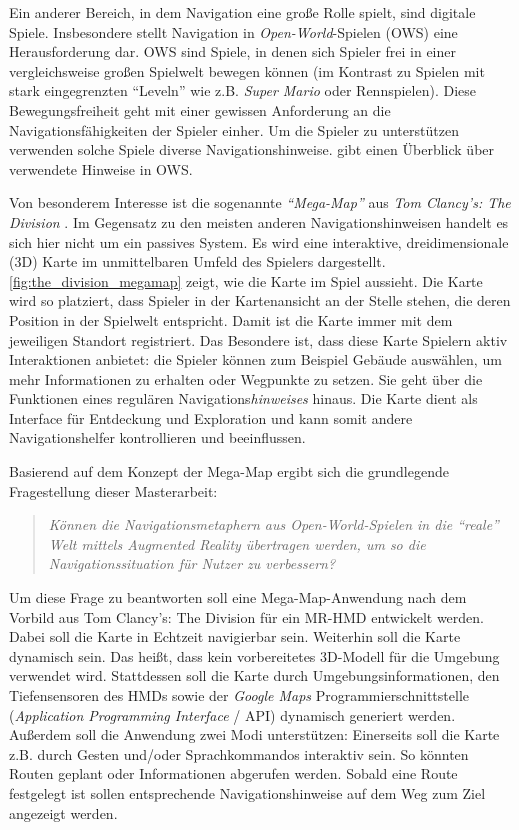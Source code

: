 \documentclass[a4paper]{scrartcl}
\begin{document}
Ein anderer Bereich, in dem Navigation eine große Rolle spielt, sind digitale Spiele.
Insbesondere stellt Navigation in \emph{Open-World}-Spielen (OWS) eine Herausforderung dar.
OWS sind Spiele, in denen sich Spieler frei in einer vergleichsweise großen Spielwelt bewegen können (im Kontrast zu Spielen mit stark eingegrenzten \enquote{Leveln} wie z.B. \emph{Super Mario} oder Rennspielen).
Diese Bewegungsfreiheit geht mit einer gewissen Anforderung an die Navigationsfähigkeiten der Spieler einher.
Um die Spieler zu unterstützen verwenden solche Spiele diverse Navigationshinweise.
\textcite{Lodts2015} gibt einen Überblick über verwendete Hinweise in OWS.

Von besonderem Interesse ist die sogenannte \emph{\enquote{Mega-Map}} aus \emph{Tom Clancy's: The Division} \autocite{Ubisoft2018}.
Im Gegensatz zu den meisten anderen Navigationshinweisen handelt es sich hier nicht um ein passives System.
Es wird eine interaktive, dreidimensionale (3D) Karte im unmittelbaren Umfeld des Spielers dargestellt.
\autoref{fig:the_division_megamap} zeigt, wie die Karte im Spiel aussieht.
Die Karte wird so platziert, dass Spieler in der Kartenansicht an der Stelle stehen, die deren Position in der Spielwelt entspricht.
Damit ist die Karte immer mit dem jeweiligen Standort registriert.
Das Besondere ist, dass diese Karte Spielern aktiv Interaktionen anbietet:
die Spieler können zum Beispiel Gebäude auswählen, um mehr Informationen zu erhalten oder Wegpunkte zu setzen.
Sie geht über die Funktionen eines regulären Navigations\emph{hinweises} hinaus.
Die Karte dient als Interface für Entdeckung und Exploration und kann somit andere Navigationshelfer kontrollieren und beeinflussen.

Basierend auf dem Konzept der Mega-Map ergibt sich die grundlegende Fragestellung dieser Masterarbeit:
\begin{quote}
	\itshape
	Können die Navigationsmetaphern aus Open-World-Spielen in die \enquote{reale} Welt mittels Augmented Reality übertragen werden, um so die Navigationssituation für Nutzer zu verbessern?
\end{quote}

Um diese Frage zu beantworten soll eine Mega-Map-Anwendung nach dem Vorbild aus Tom Clancy's: The Division für ein MR-HMD entwickelt werden.
Dabei soll die Karte in Echtzeit navigierbar sein.
Weiterhin soll die Karte dynamisch sein.
Das heißt, dass kein vorbereitetes 3D-Modell für die Umgebung verwendet wird.
Stattdessen soll die Karte durch Umgebungsinformationen, den Tiefensensoren des HMDs sowie der \emph{Google Maps} Programmierschnittstelle (\emph{Application Programming Interface} / API) dynamisch generiert werden.
Außerdem soll die Anwendung zwei Modi unterstützen: Einerseits soll die Karte z.B. durch Gesten und/oder Sprachkommandos interaktiv sein.
So könnten Routen geplant oder Informationen abgerufen werden.
Sobald eine Route festgelegt ist sollen entsprechende Navigationshinweise auf dem Weg zum Ziel angezeigt werden.
\end{document}
